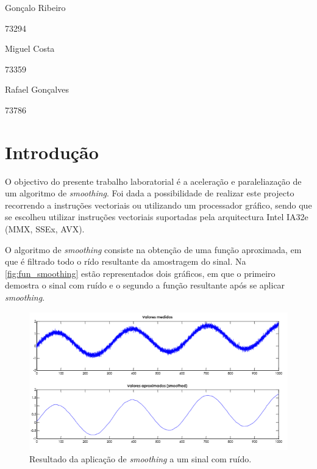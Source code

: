 \documentclass[a4paper]{article}
\begin{document}

	
	
	
	\trSetAuthors
	{
		\begin{center}
			Gonçalo Ribeiro

			73294
		\end{center}
	}{
		\begin{center}
			Miguel Costa

			73359
		\end{center}
	}{
		\begin{center}
			Rafael Gonçalves

			73786
		\end{center}
	}
		
	
	\trMakeCover
	
	\tableofcontents
	\pagebreak
	
	\section{Introdução}
	
	O objectivo do presente trabalho laboratorial é a aceleração e paraleliazação de um algoritmo de \textit{smoothing}. Foi dada a possibilidade de realizar este projecto recorrendo a instruções vectoriais ou utilizando um processador gráfico, sendo que se escolheu utilizar instruções vectoriais suportadas pela arquitectura Intel IA32e (MMX, SSEx, AVX). 
	
	O algoritmo de \textit{smoothing} consiste na obtenção de uma função aproximada, em que é filtrado todo o rído resultante da amostragem do sinal. Na \autoref{fig:fun_smoothing} estão representados dois gráficos, em que o primeiro demostra o sinal com ruído e o segundo a função resultante após se aplicar \textit{smoothing}.
	
		\begin{figure}[h]
			\centering
			\includegraphics[width=1.\textwidth]{img/fun_smoothing}
			\caption{Resultado da aplicação de \textit{smoothing} a um sinal com ruído. }
			\label{fig:fun_smoothing}
		\end{figure}
		
\end{document}
